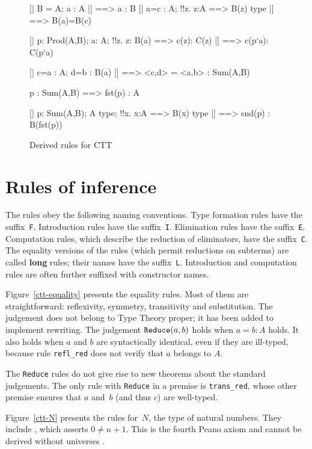 \begin{figure} 
\begin{ttbox}
    [| B = A;  a : A |] ==> a : B
  [| a=c : A;  !!z. z:A ==> B(z) type |] ==> B(a)=B(c)

     [| p: Prod(A,B);  a: A;  !!z. z: B(a) ==> c(z): C(z)
                |] ==> c(p`a): C(p`a)

    [| c=a : A;  d=b : B(a) |] ==> <c,d> = <a,b> : Sum(A,B)

  p : Sum(A,B) ==> fst(p) : A

  [| p: Sum(A,B);  A type;  !!x. x:A ==> B(x) type
          |] ==> snd(p) : B(fst(p))
\end{ttbox}

\caption{Derived rules for CTT} \label{ctt-derived}
\end{figure}


\section{Rules of inference}
The rules obey the following naming conventions.  Type formation rules have
the suffix~{\tt F}\@.  Introduction rules have the suffix~{\tt I}\@.
Elimination rules have the suffix~{\tt E}\@.  Computation rules, which
describe the reduction of eliminators, have the suffix~{\tt C}\@.  The
equality versions of the rules (which permit reductions on subterms) are
called {\bf long} rules; their names have the suffix~{\tt L}\@.
Introduction and computation rules are often further suffixed with
constructor names.

Figure~\ref{ctt-equality} presents the equality rules.  Most of them are
straightforward: reflexivity, symmetry, transitivity and substitution.  The
judgement  does not belong to Type Theory proper; it has
been added to implement rewriting.  The judgement ${\tt Reduce}(a,b)$ holds
when $a=b:A$ holds.  It also holds when $a$ and $b$ are syntactically
identical, even if they are ill-typed, because rule {\tt refl_red} does
not verify that $a$ belongs to $A$.  

The {\tt Reduce} rules do not give rise to new theorems about the standard
judgements.  The only rule with {\tt Reduce} in a premise is
{\tt trans_red}, whose other premise ensures that $a$ and~$b$ (and thus
$c$) are well-typed.

Figure~\ref{ctt-N} presents the rules for~$N$, the type of natural numbers.
They include , which asserts $0\not=n+1$.  This is
the fourth Peano axiom and cannot be derived without universes \cite[page
91]{martinlof84}.  

